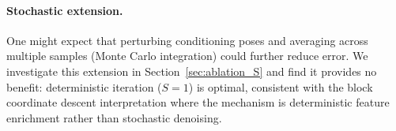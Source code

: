 \paragraph{Stochastic extension.} One might expect that perturbing conditioning poses and averaging across multiple samples (Monte Carlo integration) could further reduce error. We investigate this extension in Section~\ref{sec:ablation_S} and find it provides no benefit: deterministic iteration ($S=1$) is optimal, consistent with the block coordinate descent interpretation where the mechanism is deterministic feature enrichment rather than stochastic denoising.
